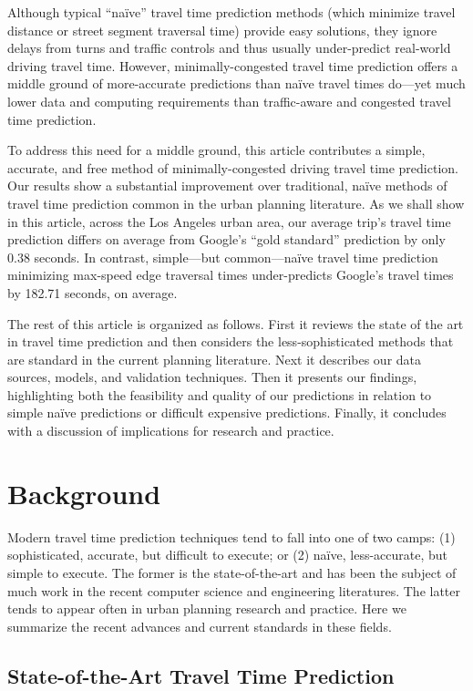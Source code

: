 \documentclass[12pt,letterpaper]{article} %
\begin{document}
Although typical \enquote{naïve} travel time prediction methods (which minimize travel distance or street segment traversal time) provide easy solutions, they ignore delays from turns and traffic controls and thus usually under-predict real-world driving travel time. However, minimally-congested travel time prediction offers a middle ground of more-accurate predictions than naïve travel times do---yet much lower data and computing requirements than traffic-aware and congested travel time prediction.

To address this need for a middle ground, this article contributes a simple, accurate, and free method of minimally-congested driving travel time prediction. Our results show a substantial improvement over traditional, naïve methods of travel time prediction common in the urban planning literature. As we shall show in this article, across the Los Angeles urban area, our average trip's travel time prediction differs on average from Google's \enquote{gold standard} prediction by only 0.38 seconds. In contrast, simple---but common---naïve travel time prediction minimizing max-speed edge traversal times under-predicts Google's travel times by 182.71 seconds, on average.

The rest of this article is organized as follows. First it reviews the state of the art in travel time prediction and then considers the less-sophisticated methods that are standard in the current planning literature. Next it describes our data sources, models, and validation techniques. Then it presents our findings, highlighting both the feasibility and quality of our predictions in relation to simple naïve predictions or difficult expensive predictions. Finally, it concludes with a discussion of implications for research and practice.

\section{Background}

Modern travel time prediction techniques tend to fall into one of two camps: (1) sophisticated, accurate, but difficult to execute; or (2) naïve, less-accurate, but simple to execute. The former is the state-of-the-art and has been the subject of much work in the recent computer science and engineering literatures. The latter tends to appear often in urban planning research and practice. Here we summarize the recent advances and current standards in these fields.

\subsection{State-of-the-Art Travel Time Prediction}
\end{document}
